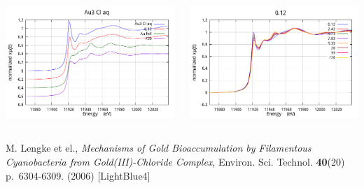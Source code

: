 \documentclass[10pt, xcolor=x11names, compress]{beamer}
\begin{document}
\begin{frame}
  \begin{columns}[T]
    \begin{column}{0.5\linewidth}
      \includegraphics[width=\linewidth]{images/AuCl/aucl_data.png}
    \end{column}
    \begin{column}{0.5\linewidth}
      \includegraphics[width=\linewidth]{images/AuCl/aucl_time.png}
    \end{column}
  \end{columns}
  \begin{bottomnote}[0.5][19]
    M. Lengke et el., \textit{Mechanisms of Gold Bioaccumulation by
      Filamentous Cyanobacteria from Gold(III)-Chloride Complex},
    Environ. Sci. Technol. \textbf{40}(20) p.~6304-6309. (2006)
    [LightBlue4]
  \end{bottomnote}
\end{frame}
\end{document}
